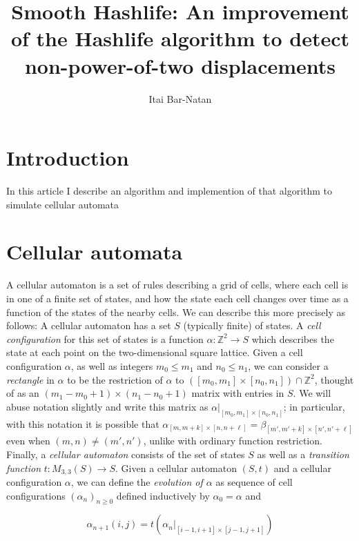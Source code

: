 \documentclass{article}
\theoremstyle{definition}
\begin{document}
\title{Smooth Hashlife: An improvement of the Hashlife algorithm to detect
non-power-of-two displacements}
\author{Itai Bar-Natan}
\maketitle

\tableofcontents

\section{Introduction}

In this article I describe an algorithm and implemention of that algorithm to
simulate cellular automata

\section{Cellular automata}
\label{sec:CA}

A cellular automaton is a set of rules describing a grid of cells, where each
cell is in one of a finite set of states, and how the state each cell changes
over time as a function of the states of the nearby cells. We can describe this
more precisely as follows: A cellular automaton has a set $S$ (typically finite)
of states. A \emph {cell configuration} for this set of states is a function
$\alpha : \mathbb {Z}^2 \to S$ which describes the state at each point on the
two-dimensional square lattice. Given a cell configuration $\alpha$, as well as
integers $m_0 \leq m_1$ and $n_0 \leq n_1$, we can consider a \emph {rectangle}
in $\alpha$ to be the restriction of $\alpha$ to $([m_0, m_1] \times [n_0, n_1])
\cap \mathbb {Z}^2$, thought of as an $(m_1-m_0+1) \times (n_1-n_0+1)$ matrix
with entries in $S$. We will abuse notation slightly and write this matrix as
$\alpha |_{[m_0, m_1] \times [n_0, n_1]}$; in particular, with this notation it
is possible that $\alpha _{[m, m+k] \times [n, n+\ell]} = \beta _{[m', m'+k]
\times [n', n'+\ell]}$ even when $(m, n) \neq (m', n')$, unlike with ordinary
function restriction. Finally, a \emph {cellular automaton} consists of the set
of states $S$ as well as a \emph {transition function} $t : M _{3, 3} (S) \to
S$.  Given a cellular automaton $(S, t)$ and a cellular configuration $\alpha$,
we can define the \emph {evolution of $\alpha$} as sequence of cell
configurations $(\alpha_n) _{n \geq 0}$ defined inductively by $\alpha_0 =
\alpha$ and

$$ \alpha _{n+1} (i, j) = t (\alpha_n |_{[i-1, i+1] \times [j-1, j+1]}) $$
\end{document}
